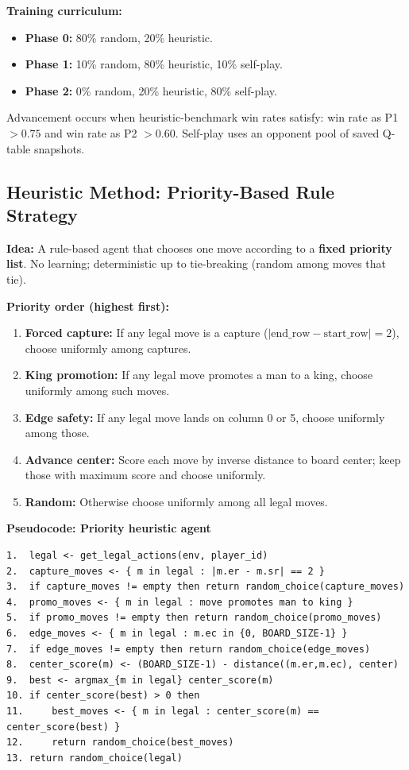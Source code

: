 \documentclass[11pt,a4paper]{article}
\begin{document}
\textbf{Training curriculum:}
\begin{itemize}[noitemsep]
  \item \textbf{Phase 0:} 80\% random, 20\% heuristic.
  \item \textbf{Phase 1:} 10\% random, 80\% heuristic, 10\% self-play.
  \item \textbf{Phase 2:} 0\% random, 20\% heuristic, 80\% self-play.
\end{itemize}
Advancement occurs when heuristic-benchmark win rates satisfy: win rate as P1 $> 0.75$ and win rate as P2 $> 0.60$. Self-play uses an opponent pool of saved Q-table snapshots.

\subsection{Heuristic Method: Priority-Based Rule Strategy}

\textbf{Idea:} A rule-based agent that chooses one move according to a \textbf{fixed priority list}. No learning; deterministic up to tie-breaking (random among moves that tie).

\textbf{Priority order (highest first):}
\begin{enumerate}[noitemsep]
  \item \textbf{Forced capture:} If any legal move is a capture ($|\text{end\_row} - \text{start\_row}| = 2$), choose uniformly among captures.
  \item \textbf{King promotion:} If any legal move promotes a man to a king, choose uniformly among such moves.
  \item \textbf{Edge safety:} If any legal move lands on column 0 or 5, choose uniformly among those.
  \item \textbf{Advance center:} Score each move by inverse distance to board center; keep those with maximum score and choose uniformly.
  \item \textbf{Random:} Otherwise choose uniformly among all legal moves.
\end{enumerate}

\textbf{Pseudocode: Priority heuristic agent}

\begin{lstlisting}
1.  legal <- get_legal_actions(env, player_id)
2.  capture_moves <- { m in legal : |m.er - m.sr| == 2 }
3.  if capture_moves != empty then return random_choice(capture_moves)
4.  promo_moves <- { m in legal : move promotes man to king }
5.  if promo_moves != empty then return random_choice(promo_moves)
6.  edge_moves <- { m in legal : m.ec in {0, BOARD_SIZE-1} }
7.  if edge_moves != empty then return random_choice(edge_moves)
8.  center_score(m) <- (BOARD_SIZE-1) - distance((m.er,m.ec), center)
9.  best <- argmax_{m in legal} center_score(m)
10. if center_score(best) > 0 then
11.     best_moves <- { m in legal : center_score(m) == center_score(best) }
12.     return random_choice(best_moves)
13. return random_choice(legal)
\end{lstlisting}
\end{document}
